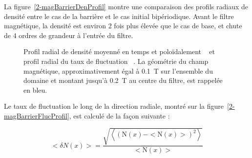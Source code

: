 \begin{refsection}
La figure~\ref{2-magBarrierDenProfil} montre une comparaison des profils radiaux de
densité entre le
cas de la barrière et le cas initial bipériodique.
Avant le filtre magnétique, la densité est environ 2 fois plus élevée que le
cas de base, et chute de 4 ordres de grandeur à l'entrée du filtre.

\begin{figure}[!htbp]
    \centering
    \caption{Profil radial de densité moyenné en temps et poloïdalement
    ~ et profil radial du taux de fluctuation
    ~.
    La géométrie du champ magnétique, approximativement égal à 0.1~T sur
    l'ensemble du domaine et montant jusqu'à 0.2~T au centre du filtre, est
    rappelée en bleu.}
    \label{2-ProfMagBarrier}
\end{figure} 

Le taux de fluctuation le long de la direction radiale, montré sur la
figure~\ref{2-magBarrierFlucProfil}, est calculé de la façon suivante :

\begin{equation}
<\delta N(x)>=\frac{\sqrt{\left<(\text{N}(x)-<\text{N}(x)>)^2\right>}}{<\text{N}(x)>}
\end{equation}


\end{refsection}
